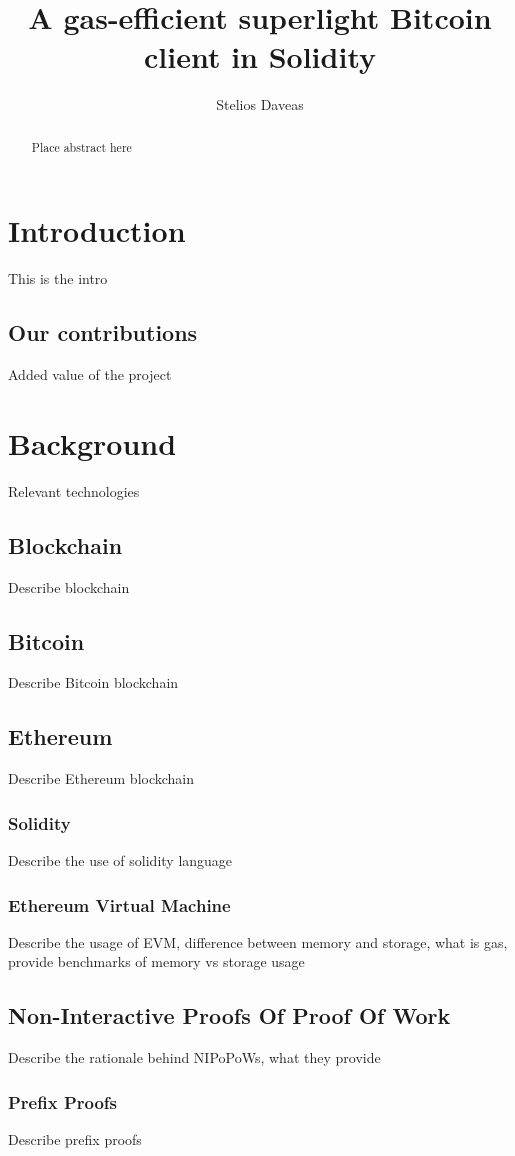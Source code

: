 \documentclass{article}
\title{A gas-efficient superlight Bitcoin client in Solidity}
\author{Stelios Daveas}
\begin{document}
\maketitle

\begin{abstract}
Place abstract here
\end{abstract}

\section{Introduction}
This is the intro
\subsection{Our contributions}
Added value of the project
\section{Background}
Relevant technologies
\subsection{Blockchain}
Describe blockchain
\subsection{Bitcoin}
Describe Bitcoin blockchain
\subsection{Ethereum}
Describe Ethereum blockchain
\subsubsection{Solidity}
Describe the use of solidity language
\subsubsection{Ethereum Virtual Machine}
Describe the usage of EVM, difference between memory and storage, what is gas, provide benchmarks of memory vs storage usage
\subsection{Non-Interactive Proofs Of Proof Of Work}
Describe the rationale behind NIPoPoWs, what they provide
\subsubsection{Prefix Proofs}
Describe prefix proofs
\end{document}
